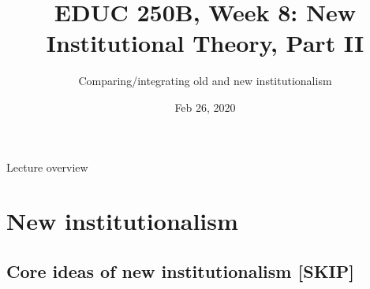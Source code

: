 
% 
 

\usepackage{comment}




%


\title[EDUC 250B, Week 8] {EDUC 250B, Week 8: New Institutional Theory, Part II}
\subtitle{Comparing/integrating old and new institutionalism}
\date{Feb 26, 2020}



\begin{frame}
	\titlepage
\end{frame}

\begin{frame}{Lecture overview}

	\tableofcontents
\end{frame}


\section[New institutionalism]{New institutionalism}

\subsection[Review]{Core ideas of new institutionalism [SKIP]}

